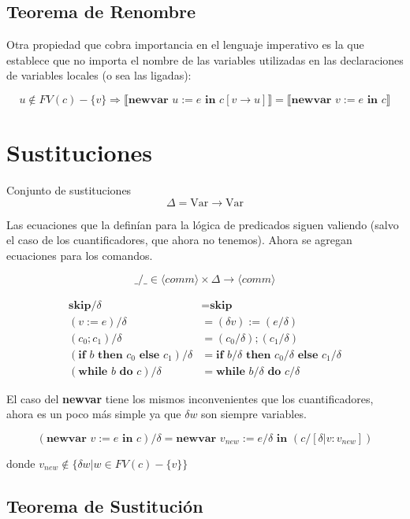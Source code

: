 \documentclass[a4paper,11pt]{article}
\begin{document}
\subsection{Teorema de Renombre}
Otra propiedad que cobra importancia en el lenguaje imperativo es la que establece que no importa el nombre de las variables utilizadas en las declaraciones de variables locales (o sea las ligadas):

$$u \notin FV(c) - \{v\} \Rightarrow \llbracket \textbf{newvar } u := e \textbf{ in } c[v \to u] \rrbracket = \llbracket \textbf{newvar } v := e \textbf{ in } c \rrbracket$$

\section{Sustituciones}
Conjunto de sustituciones
\[
\Delta = \text{Var} \to \text{Var}
\]

Las ecuaciones que la definían para la lógica de predicados siguen valiendo (salvo el caso de los cuantificadores, que ahora no tenemos). Ahora se agregan ecuaciones para los comandos.

$$\_ / \_ \in \langle comm \rangle \times \Delta \to \langle comm \rangle$$

\begin{align*}
    \textbf{skip} / \delta &= \textbf{skip} \\
    (v := e) / \delta &= (\delta v) := (e / \delta) \\
    (c_0 ; c_1) / \delta &= (c_0 / \delta) ; (c_1 / \delta) \\
    (\textbf{if } b \textbf{ then } c_0 \textbf{ else } c_1) / \delta &= \textbf{if } b / \delta \textbf{ then } c_0 / \delta \textbf{ else } c_1 / \delta \\
    (\textbf{while } b \textbf{ do } c) / \delta &= \textbf{while } b / \delta \textbf{ do } c / \delta
\end{align*}

El caso del \textbf{newvar} tiene los mismos inconvenientes que los cuantificadores, ahora es un poco más simple ya que $\delta w$ son siempre variables.

$$(\textbf{newvar } v := e \textbf{ in } c) / \delta = \textbf{newvar } v_{new} := e / \delta \textbf{ in } (c / [\delta | v : v_{new}])$$

donde $v_{new} \notin \{ \delta w | w \in FV(c) - \{v\} \}$

\subsection{Teorema de Sustitución}
\end{document}
